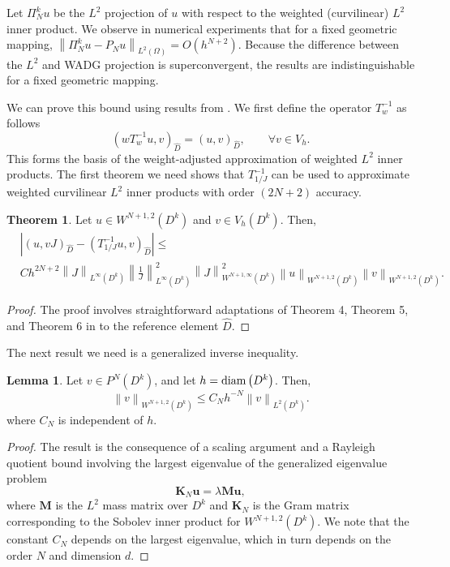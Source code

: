 \documentclass[preprint,10pt]{article}
\theoremstyle{definition}
\theoremstyle{lemma}
\newtheorem{lemma}{Lemma}
\theoremstyle{theorem}
\newtheorem{theorem}{Theorem}
\theoremstyle{assumption}
\renewcommand{\hat}{\widehat}
\newcommand{\nor}[1]{\left\| #1 \right\|}
\newcommand{\LRp}[1]{\left( #1 \right)}
\newcommand{\LRb}[1]{\left| #1 \right|}
\begin{document}
Let $\Pi_N^k u$ be the $L^2$ projection of $u$ with respect to the weighted (curvilinear) $L^2$ inner product.  We observe in numerical experiments that for a fixed geometric mapping, $\nor{\Pi_N^k u - P_N u}_{L^2\LRp{\Omega}} = O(h^{N+2})$.  Because the difference between the $L^2$ and WADG projection is superconvergent, the results are indistinguishable for a fixed geometric mapping.  

We can prove this bound using results from \cite{chan2016weight1}.  We first define the operator $T_{w}^{-1}$ as follows
\[
\LRp{wT_{w}^{-1} u,v}_{\hat{D}} = \LRp{ u,v}_{\hat{D}}, \qquad \forall v\in V_h.
\]
This forms the basis of the weight-adjusted approximation of weighted $L^2$ inner products.  The first theorem we need shows that $T_{1/J}^{-1}$ can be used to approximate weighted curvilinear $L^2$ inner products with order $(2N+2)$ accuracy.  
\begin{theorem}
\label{thm:moment}
Let $u\in W^{N+1,2}\LRp{D^k}$ and $v\in V_h\LRp{D^k}$.  Then, 
\begin{align*}
&\LRb{\LRp{u,vJ}_{\hat{D}} - \LRp{T^{-1}_{1/J}u,v}_{\hat{D}}} \leq \\
&Ch^{2N+2}\nor{J}_{L^{\infty}\LRp{D^k}}  \nor{\frac{1}{J}}_{L^{\infty}\LRp{D^k}}^2 \nor{J}^2_{W^{N+1,\infty}\LRp{D^k}}\nor{u}_{W^{N+1,2}\LRp{D^k}}\nor{v}_{W^{N+1,2}\LRp{D^k}}.
\end{align*}
\end{theorem}
\begin{proof}
The proof involves straightforward adaptations of Theorem 4, Theorem 5, and Theorem 6 in \cite{chan2016weight1} to the reference element $\hat{D}$.  
\end{proof}
The next result we need is a generalized inverse inequality.  
\begin{lemma}
\label{lemma:sobolev}
Let $v \in P^N\LRp{D^k}$, and let $h = {\rm diam}\LRp{D^k}$.  Then,
\[
\nor{v}_{W^{N+1,2}\LRp{D^k}} \leq C_{N} h^{-N} \nor{v}_{L^2\LRp{D^k}}.
\]
where $C_{N}$ is independent of $h$.
\end{lemma}
\begin{proof}
The result is the consequence of a scaling argument and a Rayleigh quotient bound involving the largest eigenvalue of the generalized eigenvalue problem  
\[
\bm{K}_N\bm{u} = \lambda\bm{M}\bm{u},
\]
where $\bm{M}$ is the $L^2$ mass matrix over $D^k$ and $\bm{K}_N$ is the Gram matrix corresponding to the Sobolev inner product for $W^{N+1,2}\LRp{D^k}$.  We note that the constant $C_N$ depends on the largest eigenvalue, which in turn depends on the order $N$ and dimension $d$.  
\end{proof}
\end{document}
